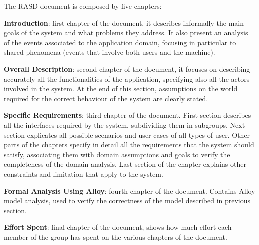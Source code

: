 The RASD document is composed by five chapters:

\textbf{Introduction}: first chapter of the document, it describes informally the main goals of the system and what problems they address. It also present an analysis of the events associated to the application domain, focusing in particular to shared phenomena (events that involve both users and the machine).

\textbf{Overall Description}: second chapter of the document, it focuses on describing accurately all the functionalities of the application, specifying also all the actors involved in the system. At the end of this section, assumptions on the world required for the correct behaviour of the system are clearly stated. 

\textbf{Specific Requirements}: third chapter of the document. First section describes all the interfaces required by the system, subdividing them in subgroups. Next section explicates all possible scenarios and user cases of all types of user. Other parts of the chapters specify in detail all the requirements that the system should satisfy, associating them with domain assumptions and goals to verify the completeness of the domain analysis. Last section of the chapter explains other constraints and limitation that apply to the system.

\textbf{Formal Analysis Using Alloy}: fourth chapter of the document. Contains Alloy model analysis, used to verify the correctness of the model described in previous section. 

\textbf{Effort Spent}: final chapter of the document, shows how much effort each member of the group has spent on the various chapters of the document.